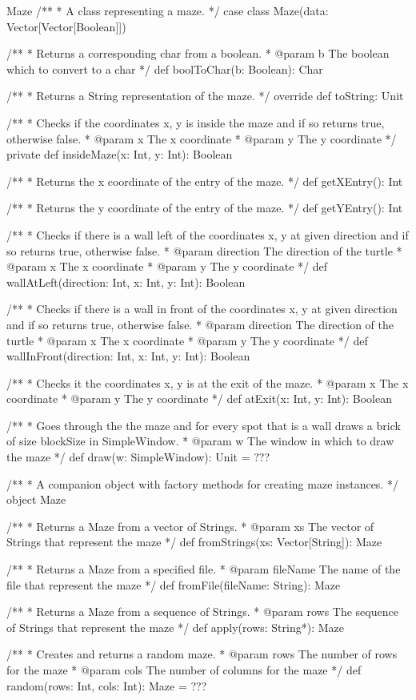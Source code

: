\begin{ScalaSpec}{Maze}
/**
 *  A class representing a maze.
 */
case class Maze(data: Vector[Vector[Boolean]]) {

  /**
   *  Returns a corresponding char from a boolean.
   *  @param b	The boolean which to convert to a char
   */
  def boolToChar(b: Boolean): Char

  /**
   *  Returns a String representation of the maze.
   */
  override def toString: Unit

  /**
   *  Checks if the coordinates x, y is inside the maze and if
   so returns true, otherwise false.
   *  @param x		The x coordinate
   *  @param y		The y coordinate
   */
  private def insideMaze(x: Int, y: Int): Boolean

  /**
   *  Returns the x coordinate of the entry of the maze.
   */
  def getXEntry(): Int

  /**
   * Returns the y coordinate of the entry of the maze.
   */
  def getYEntry(): Int

  /**
   *  Checks if there is a wall left of the coordinates x, y at
   given direction and if so returns true, otherwise false.
   *  @param direction	The direction of the turtle
   *  @param x					The x coordinate
   *  @param y					The y coordinate
   */
  def wallAtLeft(direction: Int, x: Int, y: Int): Boolean

  /**
   *  Checks if there is a wall in front of the coordinates x, y at
   given direction and if so returns true, otherwise false.
   *  @param direction	The direction of the turtle
   *  @param x					The x coordinate
   *  @param y					The y coordinate
   */
  def wallInFront(direction: Int, x: Int, y: Int): Boolean

  /**
   *  Checks it the coordinates x, y is at the exit of the maze.
   *  @param x					The x coordinate
   *  @param y					The y coordinate
   */
  def atExit(x: Int, y: Int): Boolean

  /**
   *  Goes through the the maze and for every spot that is a wall
   draws a brick of size blockSize in SimpleWindow.
   *  @param w		The window in which to draw the maze
   */
  def draw(w: SimpleWindow): Unit = ???
}

/**
 *  A companion object with factory methods for creating maze instances.
 */
object Maze {

  /**
   *  Returns a Maze from a vector of Strings.
   *  @param xs	The vector of Strings that represent the maze
   */
  def fromStrings(xs: Vector[String]): Maze

  /**
   *  Returns a Maze from a specified file.
   *  @param fileName	   The name of the file that represent the maze
   */
  def fromFile(fileName: String): Maze

  /**
   *  Returns a Maze from a sequence of Strings.
   *  @param rows	The sequence of Strings that represent the maze
   */
  def apply(rows: String*): Maze

  /**
   *  Creates and returns a random maze.
   *  @param rows		The number of rows for the maze
   *  @param cols		The number of columns for the maze
   */
  def random(rows: Int, cols: Int): Maze = ???
}

\end{ScalaSpec}


